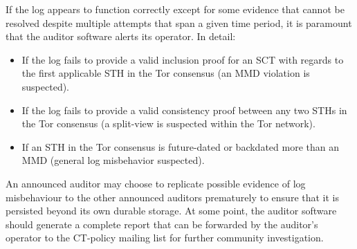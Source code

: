 If the log appears to function correctly except for some evidence that cannot be
resolved despite multiple attempts that span a given time period, it is
paramount that the auditor software alerts its operator.  In detail:
\begin{itemize}
	\item If the log fails to provide a valid inclusion proof for an SCT with
		regards to the first applicable STH in the Tor consensus
		(an MMD violation is suspected).
	\item If the log fails to provide a valid consistency proof between any two
		STHs in the Tor consensus
		(a split-view is suspected within the Tor network).
	\item If an STH in the Tor consensus is future-dated or backdated more than
		an MMD (general log misbehavior suspected).
\end{itemize}

An announced auditor may choose to replicate possible evidence of log
misbehaviour to the other announced auditors prematurely to ensure that
it is persisted beyond its own durable storage.  At some point, the auditor
software should generate a complete report that can be forwarded by the
auditor's operator to the CT-policy mailing list for further community
investigation.
